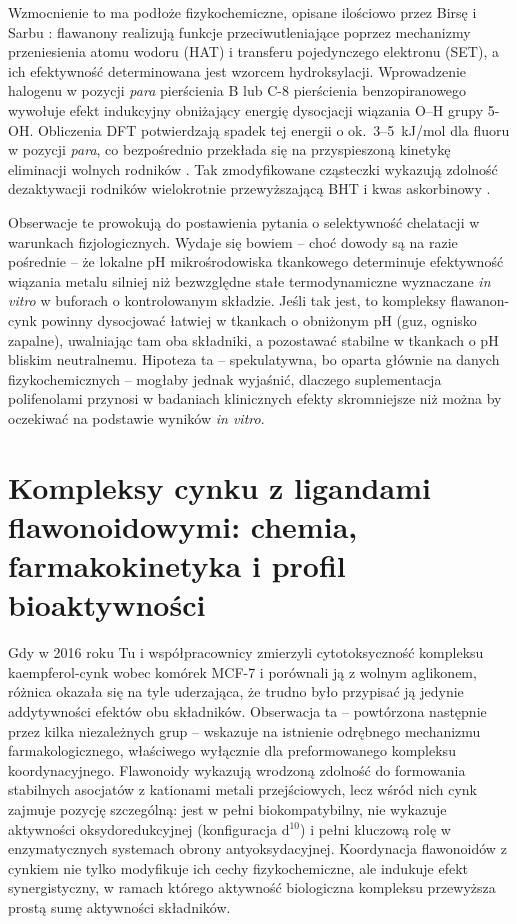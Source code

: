 \documentclass[12pt,a4paper]{article}
\begin{document}
Wzmocnienie to ma podłoże fizykochemiczne, opisane ilościowo przez Birsę i Sarbu \cite{birsa2024a, birsa2024b}: flawanony realizują funkcje przeciwutleniające poprzez mechanizmy przeniesienia atomu wodoru (HAT) i transferu pojedynczego elektronu (SET), a ich efektywność determinowana jest wzorcem hydroksylacji. Wprowadzenie halogenu w pozycji \textit{para} pierścienia B lub C-8 pierścienia benzopiranowego wywołuje efekt indukcyjny obniżający energię dysocjacji wiązania O--H grupy 5-OH. Obliczenia DFT potwierdzają spadek tej energii o ok.\ 3--5~kJ/mol dla fluoru w pozycji \textit{para}, co bezpośrednio przekłada się na przyspieszoną kinetykę eliminacji wolnych rodników \cite{birsa2024a}. Tak zmodyfikowane cząsteczki wykazują zdolność dezaktywacji rodników wielokrotnie przewyższającą BHT i kwas askorbinowy \cite{birsa2024a, birsa2024b}.

Obserwacje te prowokują do postawienia pytania o selektywność chelatacji w warunkach fizjologicznych. Wydaje się bowiem -- choć dowody są na razie pośrednie -- że lokalne pH mikrośrodowiska tkankowego determinuje efektywność wiązania metalu silniej niż bezwzględne stałe termodynamiczne wyznaczane \textit{in vitro} w buforach o kontrolowanym składzie. Jeśli tak jest, to kompleksy flawanon-cynk powinny dysocjować łatwiej w tkankach o obniżonym pH (guz, ognisko zapalne), uwalniając tam oba składniki, a pozostawać stabilne w tkankach o pH bliskim neutralnemu. Hipoteza ta -- spekulatywna, bo oparta głównie na danych fizykochemicznych -- mogłaby jednak wyjaśnić, dlaczego suplementacja polifenolami przynosi w badaniach klinicznych efekty skromniejsze niż można by oczekiwać na podstawie wyników \textit{in vitro}.

\section{Kompleksy cynku z ligandami flawonoidowymi: chemia, farmakokinetyka i profil bioaktywności}

Gdy w 2016 roku Tu i współpracownicy \cite{tu2016} zmierzyli cytotoksyczność kompleksu kaempferol-cynk wobec komórek MCF-7 i porównali ją z wolnym aglikonem, różnica okazała się na tyle uderzająca, że trudno było przypisać ją jedynie addytywności efektów obu składników. Obserwacja ta -- powtórzona następnie przez kilka niezależnych grup -- wskazuje na istnienie odrębnego mechanizmu farmakologicznego, właściwego wyłącznie dla preformowanego kompleksu koordynacyjnego. Flawonoidy wykazują wrodzoną zdolność do formowania stabilnych asocjatów z kationami metali przejściowych, lecz wśród nich cynk zajmuje pozycję szczególną: jest w pełni biokompatybilny, nie wykazuje aktywności oksydoredukcyjnej (konfiguracja d\(^{10}\)) i pełni kluczową rolę w enzymatycznych systemach obrony antyoksydacyjnej. Koordynacja flawonoidów z cynkiem nie tylko modyfikuje ich cechy fizykochemiczne, ale indukuje efekt synergistyczny, w ramach którego aktywność biologiczna kompleksu przewyższa prostą sumę aktywności składników.
\end{document}
